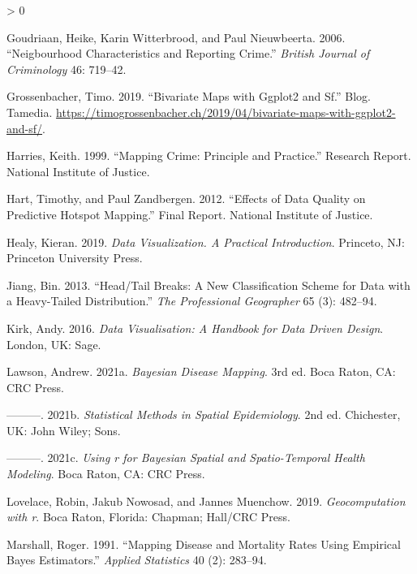 \documentclass[
]{book}
\newlength{\cslhangindent}
\newenvironment{CSLReferences}[2] %
 {%
  \setlength{\parindent}{0pt}
  \ifodd #1 \everypar{\setlength{\hangindent}{\cslhangindent}}\ignorespaces\fi
  \ifnum #2 > 0
  \setlength{\parskip}{#2\baselineskip}
  \fi
 }%
 {}
\begin{document}
\begin{CSLReferences}{1}{0}
\leavevmode\hypertarget{ref-Goudriaan_2006}{}%
Goudriaan, Heike, Karin Witterbrood, and Paul Nieuwbeerta. 2006. {``Neigbourhood Characteristics and Reporting Crime.''} \emph{British Journal of Criminology} 46: 719--42.

\leavevmode\hypertarget{ref-Grossenbacher_2019}{}%
Grossenbacher, Timo. 2019. {``Bivariate Maps with Ggplot2 and Sf.''} Blog. Tamedia. \url{https://timogrossenbacher.ch/2019/04/bivariate-maps-with-ggplot2-and-sf/}.

\leavevmode\hypertarget{ref-Harries_1999}{}%
Harries, Keith. 1999. {``Mapping Crime: Principle and Practice.''} Research Report. National Institute of Justice.

\leavevmode\hypertarget{ref-Hart_2012}{}%
Hart, Timothy, and Paul Zandbergen. 2012. {``Effects of Data Quality on Predictive Hotspot Mapping.''} Final Report. National Institute of Justice.

\leavevmode\hypertarget{ref-Healy_2019}{}%
Healy, Kieran. 2019. \emph{Data Visualization. A Practical Introduction}. Princeto, NJ: Princeton University Press.

\leavevmode\hypertarget{ref-Jiang_2013}{}%
Jiang, Bin. 2013. {``Head/Tail Breaks: A New Classification Scheme for Data with a Heavy-Tailed Distribution.''} \emph{The Professional Geographer} 65 (3): 482--94.

\leavevmode\hypertarget{ref-Kirk_2016}{}%
Kirk, Andy. 2016. \emph{Data Visualisation: A Handbook for Data Driven Design}. London, UK: Sage.

\leavevmode\hypertarget{ref-Lawson_2021a}{}%
Lawson, Andrew. 2021a. \emph{Bayesian Disease Mapping}. 3rd ed. Boca Raton, CA: CRC Press.

\leavevmode\hypertarget{ref-Lawson_2006}{}%
---------. 2021b. \emph{Statistical Methods in Spatial Epidemiology}. 2nd ed. Chichester, UK: John Wiley; Sons.

\leavevmode\hypertarget{ref-Lawson_2021b}{}%
---------. 2021c. \emph{Using r for Bayesian Spatial and Spatio-Temporal Health Modeling}. Boca Raton, CA: CRC Press.

\leavevmode\hypertarget{ref-Lovelace_2019}{}%
Lovelace, Robin, Jakub Nowosad, and Jannes Muenchow. 2019. \emph{Geocomputation with r}. Boca Raton, Florida: Chapman; Hall/CRC Press.

\leavevmode\hypertarget{ref-Marshall_1991}{}%
Marshall, Roger. 1991. {``Mapping Disease and Mortality Rates Using Empirical Bayes Estimators.''} \emph{Applied Statistics} 40 (2): 283--94.


\end{CSLReferences}
\end{document}
